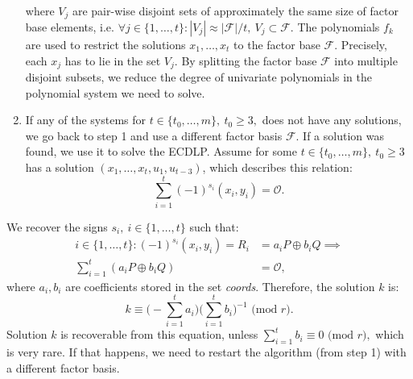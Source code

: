 \documentclass[thesis=M,english]{FITthesis}[2012/10/20]
\theoremstyle{remark}
\theoremstyle{definition}
\begin{document}
\begin{enumerate}
\begin{align*}
\end{align*}
where $V_j$ are pair-wise disjoint sets of approximately the same size of factor base elements, i.e. $\forall j \in \{1, \ldots, t\}: |V_j| \approx |\mathcal{F}|/t,\ V_j \subset \mathcal{F}.$ The polynomials $f_k$ are used to restrict the solutions $x_1,\ldots,x_t$ to the factor base $\mathcal{F}$. Precisely, each $x_j$ has to lie in the set $V_j$. By splitting the factor base $\mathcal{F}$ into multiple disjoint subsets, we reduce the degree of univariate polynomials in the polynomial system we need to solve.
\item If any of the systems for $t \in \{t_0, \ldots, m\},\ t_0 \geq 3,$ does not have any solutions, we go back to step 1 and use a different factor basis $\mathcal{F}$. If a solution was found, we use it to solve the ECDLP. Assume for some $t \in \{t_0, \ldots, m\},\ t_0 \geq 3$ has a solution $(x_1,\ldots,x_t, u_1, u_{t-3})$, which describes this relation:
$$
\sum_{i=1}^t (-1)^{s_i}(x_i, y_i) = \mathcal{O}.
$$
\end{enumerate}
We recover the signs $s_i,\ i \in \{1, \ldots, t\}$ such that:
\begin{align*}
 i \in \{1, \ldots, t\}: (-1)^{s_i}(x_i,y_i) = R_i &=  a_iP \oplus b_iQ \implies\\
 \sum_{i=1}^t(a_iP \oplus b_iQ) &= \mathcal{O},
 \end{align*}
 where $a_i, b_i$ are coefficients stored in the set \textit{coords}. Therefore, the solution $k$ is:
 $$
 k \equiv \bigg(-\sum_{i=1}^t a_i\bigg)\bigg(\sum_{i=1}^t b_i\bigg)^{-1} \text{ (mod $r$)}.
 $$
Solution $k$ is recoverable from this equation, unless $\sum_{i=1}^t b_i \equiv 0 \text{ (mod $r$)},$ which is very rare. If that happens, we need to restart the algorithm (from step 1) with a different factor basis.
\end{document}
